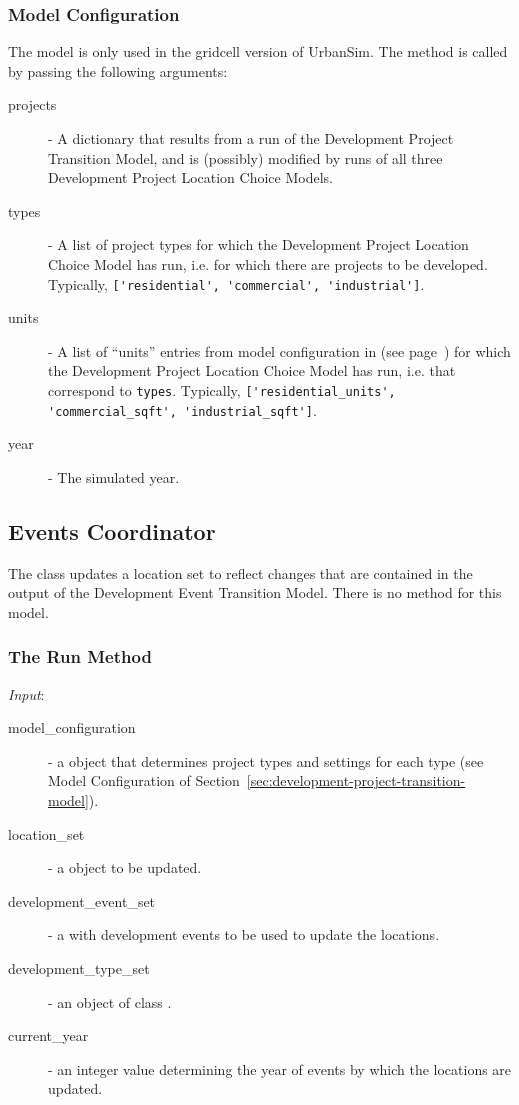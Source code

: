 \subsubsection{Model Configuration}
\modelsindex
%
The model is only used in the gridcell version of UrbanSim.
The  method is called by
passing the following arguments:
\begin{description}
\item[projects] - A dictionary that results from a run of the Development
  Project Transition Model, \modelsindex and is (possibly) modified by runs of all three
  Development Project Location Choice Models. \modelsindex
\item[types] - A list of project types for which the Development Project
  Location Choice Model \modelsindex has run, i.e. for which there are projects to be
  developed. Typically, \verb|['residential', 'commercial', 'industrial']|.
\item[units] - A list of ``units'' entries from model \modelsindex configuration in
   (see page~\pageref{page:model-configuration}) for which the
  Development Project Location Choice Model \modelsindex has run, i.e. that correspond to
  \verb|types|. Typically, \verb|['residential_units', 'commercial_sqft', 'industrial_sqft']|.
\item[year] - The simulated year.
\end{description}


%
\subsection{Events Coordinator}
\label{sec:events-coordinator}
%
The class  updates a location set to reflect changes
that are contained in the output of the Development Event Transition Model. \modelsindex
There is no  method for this model. \modelsindex
%
\subsubsection{The Run Method}
%
{\it Input}:
\begin{description}
\item[model_configuration] \modelsindex - a  object that determines
  project types and settings for each type (see Model \modelsindex Configuration of
  Section~\ref{sec:development-project-transition-model}).
\item[location_set] - a  \datasetindex object to be updated.
\item[development_event_set] - a  with development
  events to be used to update the locations.
\item[development_type_set] - an object of class .
\item[current_year] - an integer value determining the year of events by
  which the locations are updated.
\end{description}

